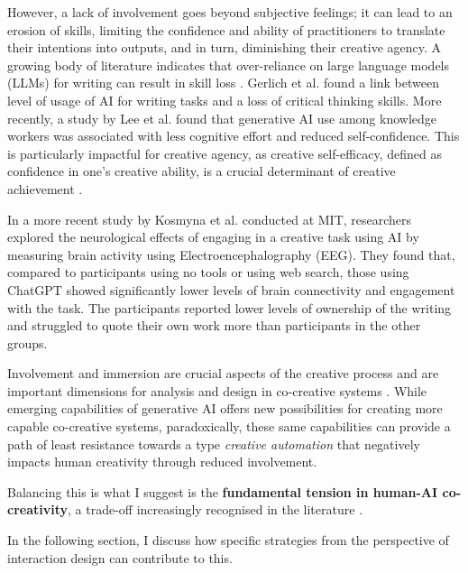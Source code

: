 However, a lack of involvement goes beyond subjective feelings; it can lead to an erosion of skills, limiting the confidence and ability of practitioners to translate their intentions into outputs, and in turn, diminishing their creative agency. A growing body of literature indicates that over-reliance on large language models (LLMs) for writing can result in skill loss \cite{Heersmink2024-mk, Rafner2021-tm}. Gerlich et al. \cite{Gerlich2025-as} found a link between level of usage of AI for writing tasks and a loss of critical thinking skills. More recently, a study by Lee et al. \cite{Lee2025-dw} found that generative AI use among knowledge workers was associated with less cognitive effort and reduced self-confidence. This is particularly impactful for creative agency, as creative self-efficacy, defined as confidence in one's creative ability, is a crucial determinant of creative achievement \cite{Tierney2002-xp}.

In a more recent study by Kosmyna et al. \cite{Kosmyna2025-cm} conducted at MIT, researchers explored the neurological effects of engaging in a creative task using AI by measuring brain activity using Electroencephalography (EEG). They found that, compared to participants using no tools or using web search, those using ChatGPT showed significantly lower levels of brain connectivity and engagement with the task. The participants reported lower levels of ownership of the writing and struggled to quote their own work more than participants in the other groups.

Involvement and immersion are crucial aspects of the creative process \cite{Amabile1996-pt, Csikszentmihalyi1997-ui} and are important dimensions for analysis and design in co-creative systems \cite{Davis2016-te, Cherry2014-ty, Rezwana2022-ui, Clark2018-yf, Lawton2023-gd, Yuan2022-kb, Li2024-yh, Kantosalo2015-pk, Resnick2005-fs}. While emerging capabilities of generative AI offers new possibilities for creating more capable co-creative systems, paradoxically, these same capabilities can provide a path of least resistance towards a type \textit{creative automation} that negatively impacts human creativity through reduced involvement. 

Balancing this is what I suggest is the \textbf{fundamental tension in human-AI co-creativity}, a trade-off increasingly recognised in the literature \cite{Moruzzi2024-cq}.

In the following section, I discuss how specific strategies from the perspective of interaction design can contribute to this. 

